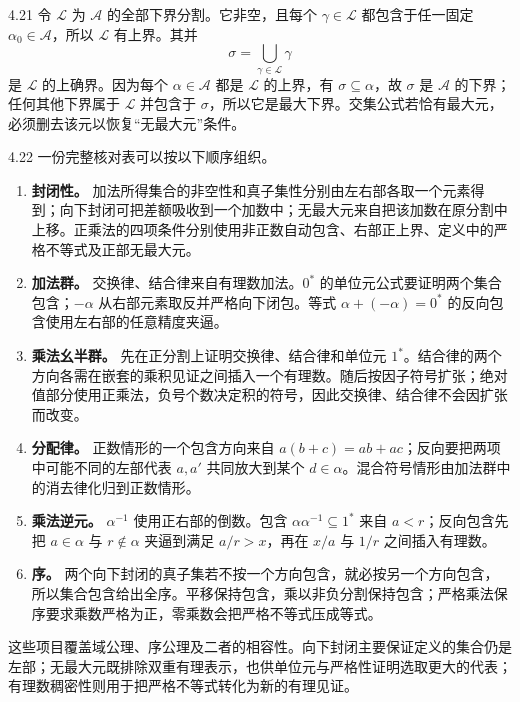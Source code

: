 \begin{solution}{4.21}
令 \(\mathcal L\) 为 \(\mathcal A\) 的全部下界分割。它非空，且每个 \(\gamma\in\mathcal L\) 都包含于任一固定 \(\alpha_0\in\mathcal A\)，所以 \(\mathcal L\) 有上界。其并
\[
 \sigma=\bigcup_{\gamma\in\mathcal L}\gamma
\]
是 \(\mathcal L\) 的上确界。因为每个 \(\alpha\in\mathcal A\) 都是 \(\mathcal L\) 的上界，有 \(\sigma\subseteq\alpha\)，故 \(\sigma\) 是 \(\mathcal A\) 的下界；任何其他下界属于 \(\mathcal L\) 并包含于 \(\sigma\)，所以它是最大下界。交集公式若恰有最大元，必须删去该元以恢复“无最大元”条件。
\end{solution}

\begin{solution}{4.22}
一份完整核对表可以按以下顺序组织。
\begin{enumerate}
 \item \textbf{封闭性。} 加法所得集合的非空性和真子集性分别由左右部各取一个元素得到；向下封闭可把差额吸收到一个加数中；无最大元来自把该加数在原分割中上移。正乘法的四项条件分别使用非正数自动包含、右部正上界、定义中的严格不等式及正部无最大元。
 \item \textbf{加法群。} 交换律、结合律来自有理数加法。\(0^*\) 的单位元公式要证明两个集合包含；\(-\alpha\) 从右部元素取反并严格向下闭包。等式
 \(\alpha+(-\alpha)=0^*\) 的反向包含使用左右部的任意精度夹逼。
 \item \textbf{乘法幺半群。} 先在正分割上证明交换律、结合律和单位元 \(1^*\)。结合律的两个方向各需在嵌套的乘积见证之间插入一个有理数。随后按因子符号扩张；绝对值部分使用正乘法，负号个数决定积的符号，因此交换律、结合律不会因扩张而改变。
 \item \textbf{分配律。} 正数情形的一个包含方向来自
 \(a(b+c)=ab+ac\)；反向要把两项中可能不同的左部代表
 \(a,a'\) 共同放大到某个 \(d\in\alpha\)。混合符号情形由加法群中的消去律化归到正数情形。
 \item \textbf{乘法逆元。} \(\alpha^{-1}\) 使用正右部的倒数。包含
 \(\alpha\alpha^{-1}\subseteq1^*\) 来自 \(a<r\)；反向包含先把
 \(a\in\alpha\) 与 \(r\notin\alpha\) 夹逼到满足 \(a/r>x\)，再在
 \(x/a\) 与 \(1/r\) 之间插入有理数。
 \item \textbf{序。} 两个向下封闭的真子集若不按一个方向包含，就必按另一个方向包含，所以集合包含给出全序。平移保持包含，乘以非负分割保持包含；严格乘法保序要求乘数严格为正，零乘数会把严格不等式压成等式。
\end{enumerate}

这些项目覆盖域公理、序公理及二者的相容性。向下封闭主要保证定义的集合仍是左部；无最大元既排除双重有理表示，也供单位元与严格性证明选取更大的代表；有理数稠密性则用于把严格不等式转化为新的有理见证。
\end{solution}

